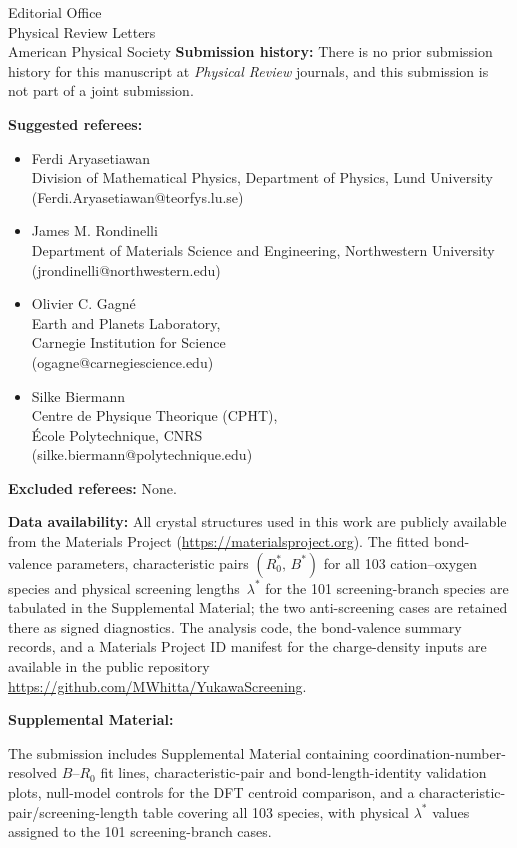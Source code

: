 \documentclass[11pt]{letter}
\begin{document}
\begin{letter}{Editorial Office\\Physical Review Letters\\American Physical Society}
\textbf{Submission history:} There is no prior submission history for
this manuscript at \textit{Physical Review} journals, and this
submission is not part of a joint submission.

\textbf{Suggested referees:}
\begin{itemize}[leftmargin=1.5em,itemsep=2pt,parsep=0pt]
\item Ferdi Aryasetiawan\\
  Division of Mathematical Physics, Department of Physics, Lund University\\
  (Ferdi.Aryasetiawan@teorfys.lu.se)
\item James M. Rondinelli\\
  Department of Materials Science and Engineering, Northwestern University\\
  (jrondinelli@northwestern.edu)
\item Olivier C. Gagn\'e\\
  Earth and Planets Laboratory,\\
  Carnegie Institution for Science\\
  (ogagne@carnegiescience.edu)
\item Silke Biermann\\
  Centre de Physique Theorique (CPHT),\\
  \'{E}cole Polytechnique, CNRS\\
  (silke.biermann@polytechnique.edu)
\end{itemize}

\textbf{Excluded referees:} None.

\textbf{Data availability:} All crystal structures used in this work
are publicly available from the Materials Project
(\url{https://materialsproject.org}).  The fitted bond-valence
parameters, characteristic pairs $(R_0^*,\,B^*)$ for all 103
cation--oxygen species and physical screening lengths~$\lambda^*$ for
the 101 screening-branch species are tabulated in the Supplemental
Material; the two anti-screening cases are retained there as signed
diagnostics.  The analysis code, the bond-valence summary records, and
a Materials Project ID manifest for the charge-density inputs are
available in the public repository
\url{https://github.com/MWhitta/YukawaScreening}.

\textbf{Supplemental Material:}

The submission includes Supplemental Material containing
coordination-number-resolved $B$--$R_0$ fit lines, characteristic-pair
and bond-length-identity validation plots, null-model controls for the
DFT centroid comparison, and a characteristic-pair/screening-length
table covering all 103 species, with physical $\lambda^*$ values
assigned to the 101 screening-branch cases.


\end{letter}
\end{document}
